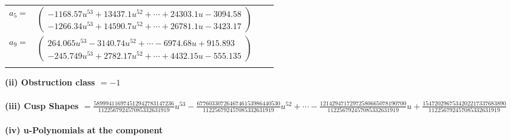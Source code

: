 \documentclass[1p]{elsarticle_modified}
\theoremstyle{definition}
\begin{document}
\begin{tabular}{m{7pt} m{180pt} m{7pt} m{180pt} }
\flushright $a_{5}=$&$\begin{pmatrix}-1168.57 u^{53}+13437.1 u^{52}+\cdots+24303.1 u-3094.58\\-1266.34 u^{53}+14590.7 u^{52}+\cdots+26781.1 u-3423.17\end{pmatrix}$ \\
\flushright $a_{9}=$&$\begin{pmatrix}264.065 u^{53}-3140.74 u^{52}+\cdots-6974.68 u+915.893\\-245.749 u^{53}+2782.17 u^{52}+\cdots+4432.15 u-555.135\end{pmatrix}$\\&\end{tabular}
\flushleft \textbf{(ii) Obstruction class $= -1$}\\~\\
\flushleft \textbf{(iii) Cusp Shapes $= \frac{589994116974512942783147236}{112256792457085332631919} u^{53}-\frac{6776033072646746153986440530}{112256792457085332631919} u^{52}+\cdots-\frac{12142947172972580665078190700}{112256792457085332631919} u+\frac{1547202967534202217337683890}{112256792457085332631919}$}\\~\\
\newpage\renewcommand{\arraystretch}{1}
\flushleft \textbf{(iv) u-Polynomials at the component}\newline \\
\end{document}
